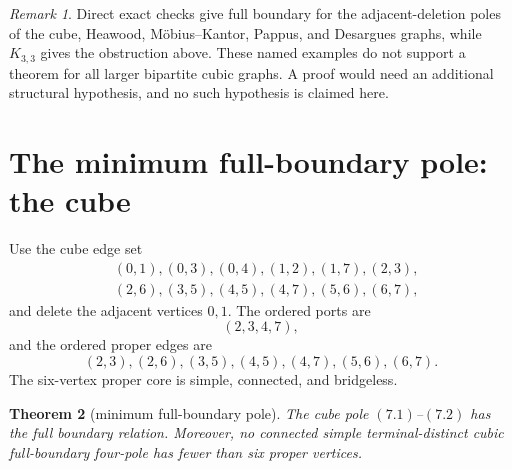\documentclass[11pt]{article}
\newtheorem{theorem}{Theorem}[section]
\theoremstyle{definition}
\theoremstyle{remark}
\newtheorem{remark}[theorem]{Remark}
\begin{document}
\begin{remark}
Direct exact checks give full boundary for the adjacent-deletion poles of
the cube, Heawood, M\"obius--Kantor, Pappus, and Desargues graphs, while
\(K_{3,3}\) gives the obstruction above.  These named examples do not
support a theorem for all larger bipartite cubic graphs.  A proof would
need an additional structural hypothesis, and no such hypothesis is
claimed here.
\end{remark}

\section{The minimum full-boundary pole: the cube}

Use the cube edge set
\[
\begin{split}
 &(0,1),(0,3),(0,4),(1,2),(1,7),(2,3),\\
 &(2,6),(3,5),(4,5),(4,7),(5,6),(6,7),
\end{split}
\]
and delete the adjacent vertices \(0,1\).  The ordered ports are
\[
                         (2,3,4,7),                         \tag{7.1}
\]
and the ordered proper edges are
\[
 (2,3),(2,6),(3,5),(4,5),(4,7),(5,6),(6,7).               \tag{7.2}
\]
The six-vertex proper core is simple, connected, and bridgeless.

\begin{theorem}[minimum full-boundary pole]\label{thm:cube}
The cube pole \((7.1)\)--\((7.2)\) has the full boundary relation.
Moreover, no connected simple terminal-distinct cubic full-boundary
four-pole has fewer than six proper vertices.
\end{theorem}
\end{document}
